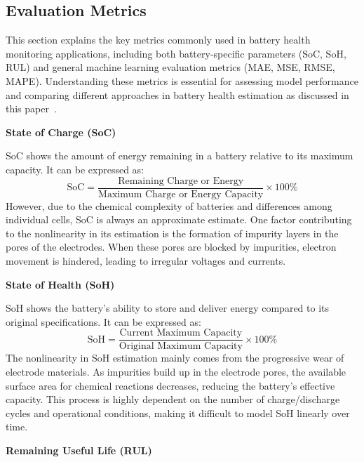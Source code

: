 \subsection{Evaluation Metrics}

This section explains the key metrics commonly used in battery health monitoring applications, including both battery-specific parameters (SoC, SoH, RUL) and general machine learning evaluation metrics (MAE, MSE, RMSE, MAPE). Understanding these metrics is essential for assessing model performance and comparing different approaches in battery health estimation as discussed in this paper~\cite{ren_review_2023}.

\vspace{1cm}
\textbf{State of Charge (SoC)}

SoC shows the amount of energy remaining in a battery relative to its maximum capacity. It can be expressed as:
\begin{equation}
\text{SoC} = \frac{\text{Remaining Charge or Energy}}{\text{Maximum Charge or Energy Capacity}} \times 100\%
\end{equation}
However, due to the chemical complexity of batteries and differences among individual cells, SoC is always an approximate estimate. One factor contributing to the nonlinearity in its estimation is the formation of impurity layers in the pores of the electrodes. When these pores are blocked by impurities, electron movement is hindered, leading to irregular voltages and currents.

\vspace{1cm}
\textbf{State of Health (SoH)}

SoH shows the battery's ability to store and deliver energy compared to its original specifications. It can be expressed as:
\begin{equation}
\text{SoH} = \frac{\text{Current Maximum Capacity}}{\text{Original Maximum Capacity}} \times 100\%
\end{equation}
The nonlinearity in SoH estimation mainly comes from the progressive wear of electrode materials. As impurities build up in the electrode pores, the available surface area for chemical reactions decreases, reducing the battery's effective capacity. This process is highly dependent on the number of charge/discharge cycles and operational conditions, making it difficult to model SoH linearly over time.


\vspace{1cm}
\textbf{Remaining Useful Life (RUL)}

